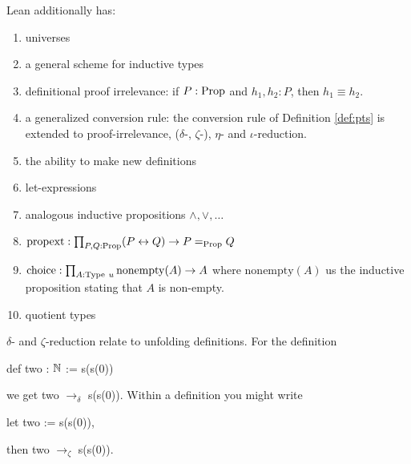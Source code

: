 \begin{rem}
    Lean additionally has:
    \begin{enumerate}
        \item universes
        \item a general scheme for inductive types
        \item definitional proof irrelevance: if $P : \mathrm{Prop}$ and $h_1, h_2 : P$, then $h_1 \equiv h_2$.
        \item a generalized conversion rule: the conversion rule of Definition \ref{def:pts} is extended to proof-irrelevance, ($\delta$-, $\zeta$-), $\eta$- and $\iota$-reduction.
        \item the ability to make new definitions
        \item let-expressions
        \item analogous inductive propositions ${\wedge}, {\vee}, \dots$
        \item $\mathrm{propext}: \prod_{P, Q : \mathrm{Prop}} (P \leftrightarrow Q) \to P \mathrel{=_{\mathrm{Prop}}} Q$
        \item $\mathrm{choice} : \prod_{A : \mathrm{Type}\ u} \mathrm{nonempty}(A) \to A$ where $\mathrm{nonempty}(A)$ us the inductive proposition stating that $A$ is non-empty.
        \item quotient types
    \end{enumerate}
\end{rem}

\begin{example}
    $\delta$- and $\zeta$-reduction relate to unfolding definitions.
    For the definition
    \begin{center}
        {\ttfamily def two : $\mathbb{N}$ := s(s(0))}
    \end{center}
    we get {\ttfamily two $\mathrel{\to_\delta}$ s(s(0))}.
    Within a definition you might write
    \begin{center}
        {\ttfamily let two := s(s(0))},
    \end{center}
    then {\ttfamily two $\to_{\zeta}$ s(s(0))}.
\end{example}

